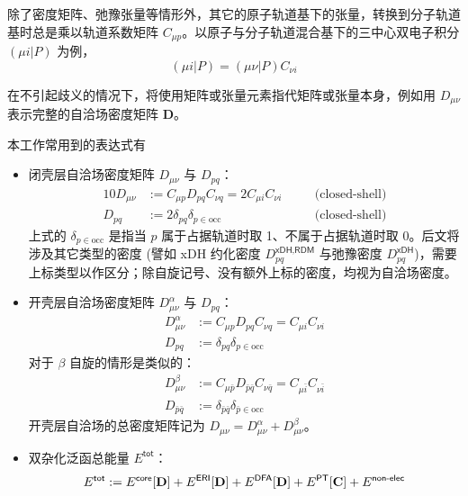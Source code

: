 除了密度矩阵、弛豫张量等情形外，其它的原子轨道基下的张量，转换到分子轨道基时总是乘以轨道系数矩阵 $C_{\mu p}$。以原子与分子轨道混合基下的三中心双电子积分 $(\mu i | P)$ 为例，
\begin{equation*}
  (\mu i | P) = (\mu \nu | P) C_{\nu i}
\end{equation*}

在不引起歧义的情况下，将使用矩阵或张量元素指代矩阵或张量本身，例如用 $D_{\mu \nu}$ 表示完整的自洽场密度矩阵 $\mathbf{D}$。

本工作常用到的表达式有
\begin{itemize}[nosep]
  \item 闭壳层自洽场密度矩阵 $D_{\mu \nu}$ 与 $D_{pq}$：
        \begin{alignat}{10}
          \label{eq.def.dm-scf-closed}
          D_{\mu \nu} &:= C_{\mu p} D_{pq} C_{\nu q} = 2 C_{\mu i} C_{\nu i} \quad &&\text{(closed-shell)} \\
          D_{pq} &:= 2 \delta_{pq} \delta_{p \in \mathrm{occ}} \quad &&\text{(closed-shell)}
        \end{alignat}
        上式的 $\delta_{p \in \mathrm{occ}}$ 是指当 $p$ 属于占据轨道时取 1、不属于占据轨道时取 0。后文将涉及其它类型的密度 (譬如 xDH 约化密度 $D_{pq}^{\textsf{xDH}, \textsf{RDM}}$ 与弛豫密度 $D_{pq}^{\textsf{xDH}}$)，需要上标类型以作区分；除自旋记号、没有额外上标的密度，均视为自洽场密度。
  \item 开壳层自洽场密度矩阵 $D_{\mu \nu}^\alpha$ 与 $D_{pq}$：
        \begin{align}
          D_{\mu \nu}^\alpha &:= C_{\mu p} D_{pq} C_{\nu q} = C_{\mu i} C_{\nu i} \\
          D_{pq} &:= \delta_{pq} \delta_{p \in \mathrm{occ}}
        \end{align}
        对于 $\beta$ 自旋的情形是类似的：
        \begin{align}
          D_{\mu \nu}^\beta &:= C_{\mu \bar p} D_{\bar p \bar q} C_{\nu \bar q} = C_{\mu \bar i} C_{\nu \bar i} \\
          D_{\bar p \bar q} &:= \delta_{\bar p \bar q} \delta_{\bar p \in \mathrm{occ}}
        \end{align}
        开壳层自洽场的总密度矩阵记为 $D_{\mu \nu} = D_{\mu \nu}^\alpha + D_{\mu \nu}^\beta$。
  \item 双杂化泛函总能量 $E^\textsf{tot}$：
        \begin{equation}
          \label{eq.def-E-tot}
          E^\textsf{tot} := E^\textsf{core} [\mathbf{D}] + E^\textsf{ERI} [\mathbf{D}] + E^\textsf{DFA} [\mathbf{D}] + E^\textsf{PT} [\mathbf{C}] + E^\textsf{non-elec} \\

\end{equation}
\end{itemize}
